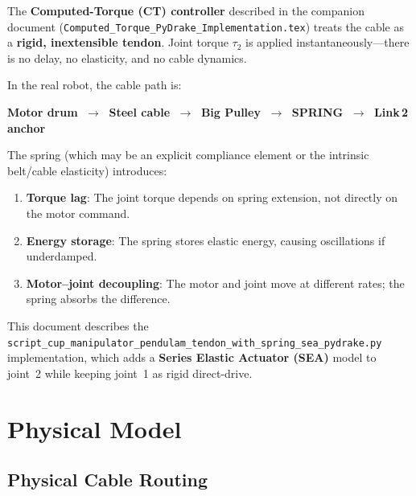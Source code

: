 \documentclass[11pt,a4paper]{article}
\begin{document}
The \textbf{Computed-Torque (CT) controller} described in the companion document (\texttt{Computed\_Torque\_PyDrake\_Implementation.tex}) treats the cable as a \textbf{rigid, inextensible tendon}.  Joint torque $\tau_2$ is applied instantaneously---there is no delay, no elasticity, and no cable dynamics.

In the real robot, the cable path is:

\begin{center}
\textbf{Motor drum} $\;\longrightarrow\;$ \textbf{Steel cable} $\;\longrightarrow\;$ \textbf{Big Pulley} $\;\longrightarrow\;$ \textbf{SPRING} $\;\longrightarrow\;$ \textbf{Link\,2 anchor}
\end{center}

The spring (which may be an explicit compliance element or the intrinsic belt/cable elasticity) introduces:
\begin{enumerate}[leftmargin=2em]
    \item \textbf{Torque lag}: The joint torque depends on spring extension, not directly on the motor command.
    \item \textbf{Energy storage}: The spring stores elastic energy, causing oscillations if underdamped.
    \item \textbf{Motor--joint decoupling}: The motor and joint move at different rates; the spring absorbs the difference.
\end{enumerate}

This document describes the \texttt{script\_cup\_manipulator\_pendulam\_tendon\_with\_spring\_sea\_pydrake.py} implementation, which adds a \textbf{Series Elastic Actuator (SEA)} model to joint~2 while keeping joint~1 as rigid direct-drive.


\section{Physical Model}
\label{sec:physics}

\subsection{Physical Cable Routing}
\end{document}
